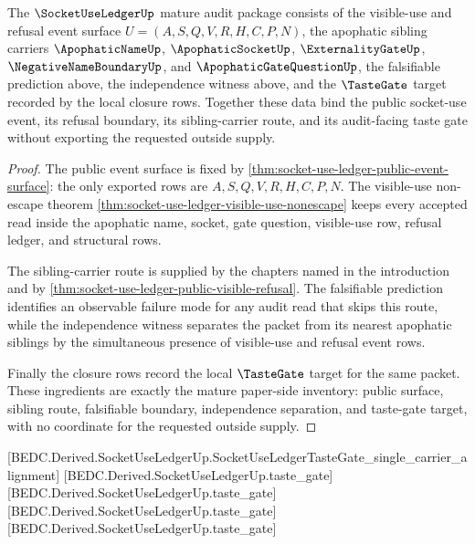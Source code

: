 \begin{theorem}
\label{thm:socket-use-ledger-mature-audit-package}
The $\SocketUseLedgerUp$ mature audit package consists of the visible-use and refusal event surface $U=(A,S,Q,V,R,H,C,P,N)$, the apophatic sibling carriers $\ApophaticNameUp$, $\ApophaticSocketUp$, $\ExternalityGateUp$, $\NegativeNameBoundaryUp$, and $\ApophaticGateQuestionUp$, the falsifiable prediction above, the independence witness above, and the $\TasteGate$ target recorded by the local closure rows. Together these data bind the public socket-use event, its refusal boundary, its sibling-carrier route, and its audit-facing taste gate without exporting the requested outside supply.
\end{theorem}
\begin{proof}
The public event surface is fixed by \autoref{thm:socket-use-ledger-public-event-surface}: the only exported rows are $A,S,Q,V,R,H,C,P,N$. The visible-use non-escape theorem \autoref{thm:socket-use-ledger-visible-use-nonescape} keeps every accepted read inside the apophatic name, socket, gate question, visible-use row, refusal ledger, and structural rows.

The sibling-carrier route is supplied by the chapters named in the introduction and by \autoref{thm:socket-use-ledger-public-visible-refusal}. The falsifiable prediction identifies an observable failure mode for any audit read that skips this route, while the independence witness separates the packet from its nearest apophatic siblings by the simultaneous presence of visible-use and refusal event rows.

Finally the closure rows record the local $\TasteGate$ target for the same packet. These ingredients are exactly the mature paper-side inventory: public surface, sibling route, falsifiable boundary, independence separation, and taste-gate target, with no coordinate for the requested outside supply.
\end{proof}

[BEDC.Derived.SocketUseLedgerUp.SocketUseLedgerTasteGate\_single\_carrier\_alignment]
[BEDC.Derived.SocketUseLedgerUp.taste\_gate]
[BEDC.Derived.SocketUseLedgerUp.taste\_gate]
[BEDC.Derived.SocketUseLedgerUp.taste\_gate]
[BEDC.Derived.SocketUseLedgerUp.taste\_gate]

